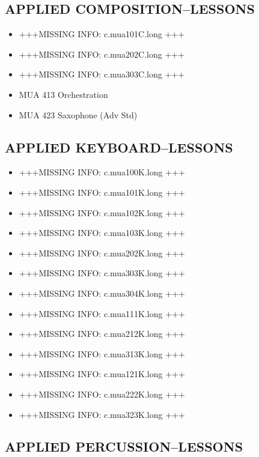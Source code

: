 \documentclass[
  letterpaper,
]{scrbook}
\providecommand{\tightlist}{%
  \setlength{\itemsep}{0pt}\setlength{\parskip}{0pt}}
\begin{document}
\subsection{APPLIED
COMPOSITION--LESSONS}\label{applied-compositionlessons}

\begin{itemize}
\tightlist
\item
  +++MISSING INFO: c.mua101C.long +++
\item
  +++MISSING INFO: c.mua202C.long +++
\item
  +++MISSING INFO: c.mua303C.long +++
\item
  MUA 413 Orchestration
\item
  MUA 423 Saxophone (Adv Std)
\end{itemize}

\subsection{APPLIED KEYBOARD--LESSONS}\label{applied-keyboardlessons}

\begin{itemize}
\tightlist
\item
  +++MISSING INFO: c.mua100K.long +++
\item
  +++MISSING INFO: c.mua101K.long +++
\item
  +++MISSING INFO: c.mua102K.long +++
\item
  +++MISSING INFO: c.mua103K.long +++
\item
  +++MISSING INFO: c.mua202K.long +++
\item
  +++MISSING INFO: c.mua303K.long +++
\item
  +++MISSING INFO: c.mua304K.long +++
\item
  +++MISSING INFO: c.mua111K.long +++
\item
  +++MISSING INFO: c.mua212K.long +++
\item
  +++MISSING INFO: c.mua313K.long +++
\item
  +++MISSING INFO: c.mua121K.long +++
\item
  +++MISSING INFO: c.mua222K.long +++
\item
  +++MISSING INFO: c.mua323K.long +++
\end{itemize}

\subsection{APPLIED
PERCUSSION--LESSONS}\label{applied-percussionlessons}
\end{document}
